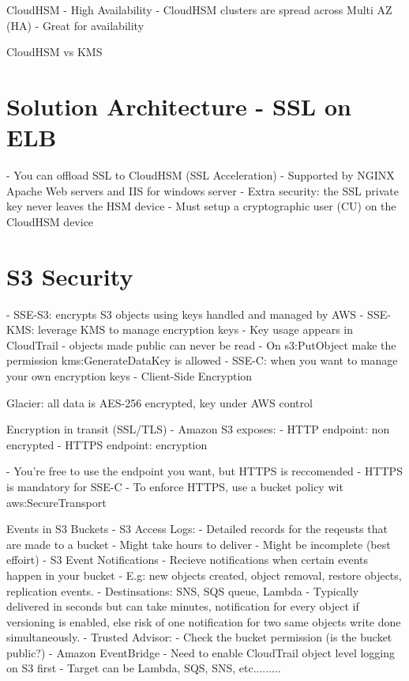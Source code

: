 \documentclass[11pt]{book}
\begin{document}
    CloudHSM - High Availability
    - CloudHSM clusters are spread across Multi AZ (HA)
    - Great for availability


    CloudHSM vs KMS



    \section{Solution Architecture - SSL on ELB}


    - You can offload SSL to CloudHSM (SSL Acceleration)
    - Supported by NGINX Apache Web servers and IIS for windows server
    - Extra security: the SSL private key never leaves the HSM device
    - Must setup a cryptographic user (CU) on the CloudHSM device


    \section{S3 Security}
    - SSE-S3: encrypts S3 objects using keys handled and managed by AWS
    - SSE-KMS: leverage KMS to manage encryption keys
        - Key usage appears in CloudTrail
        - objects made public can never be read
        - On s3:PutObject make the permission kms:GenerateDataKey is allowed
    - SSE-C: when you want to manage your own encryption keys
    - Client-Side Encryption

    Glacier: all data is AES-256 encrypted, key under AWS control

    Encryption in transit (SSL/TLS)
    - Amazon S3 exposes:
        - HTTP endpoint: non encrypted
        - HTTPS endpoint: encryption

    - You're free to use the endpoint you want, but HTTPS is reccomended
    - HTTPS is mandatory for SSE-C
    - To enforce HTTPS, use a bucket policy wit aws:SecureTransport

    Events in S3 Buckets
    - S3 Access Logs:
        - Detailed records for the reqeusts that are made to a bucket
        - Might take hours to deliver
        - Might be incomplete (best effoirt)
    - S3 Event Notifications
        - Recieve notifications when certain events happen in your bucket
        - E.g: new objects created, object removal, restore objects, replication events.
        - Destinsations: SNS, SQS queue, Lambda
        - Typically delivered in seconds but can take minutes, notification for every object if versioning is enabled, else risk of one notification for two same objects write done simultaneously.
    - Trusted Advisor:
        - Check the bucket permission (is the bucket public?)
    - Amazon EventBridge
        - Need to enable CloudTrail object level logging on S3 first
        - Target can be Lambda, SQS, SNS, etc.........
\end{document}

